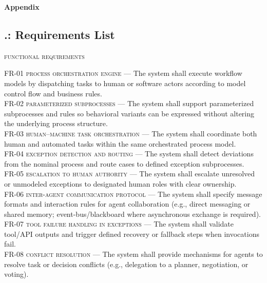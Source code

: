 
\printbibliography[heading=bibintoc,title={References}]

\clearpage
\appendix
{}      %
\setcounter{subsection}{0}    %
\begin{center}\huge\bfseries Appendix\end{center}

\subsection*{\thesection.: Requirements List}\label{app:req-list}
\noindent \textsc{functional requirements} \\
\begin{footnotesize}
\noindent \textsc{FR-01 process orchestration engine} --- The system shall execute workflow models by dispatching tasks to human or software actors according to model control flow and business rules. \\
\noindent \textsc{FR-02 parameterized subprocesses} --- The system shall support parameterized subprocesses and rules so behavioral variants can be expressed without altering the underlying process structure. \\
\noindent \textsc{FR-03 human–machine task orchestration} --- The system shall coordinate both human and automated tasks within the same orchestrated process model. \\
\noindent \textsc{FR-04 exception detection and routing} --- The system shall detect deviations from the nominal process and route cases to defined exception subprocesses. \\
\noindent \textsc{FR-05 escalation to human authority} --- The system shall escalate unresolved or unmodeled exceptions to designated human roles with clear ownership. \\
\noindent \textsc{FR-06 inter-agent communication protocol} --- The system shall specify message formats and interaction rules for agent collaboration (e.g., direct messaging or shared memory; event-bus/blackboard where asynchronous exchange is required).\\
\noindent \textsc{FR-07 tool failure handling in exceptions} --- The system shall validate tool/API outputs and trigger defined recovery or fallback steps when invocations fail.\\
\noindent \textsc{FR-08 conflict resolution} --- The system shall provide mechanisms for agents to resolve task or decision conflicts (e.g., delegation to a planner, negotiation, or voting).\\

\end{footnotesize}
